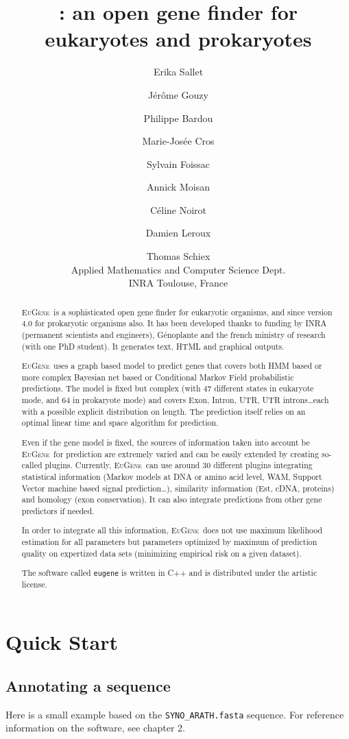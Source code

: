 \documentclass[a4paper,titlepage]{report}
\author{Erika Sallet \and J\'er\^ome Gouzy \and Philippe Bardou \and Marie-Jos\'ee Cros \and Sylvain Foissac \and  Annick Moisan \and C\'eline Noirot \and Damien Leroux \and Thomas Schiex \\ Applied Mathematics and Computer Science Dept.\\ INRA Toulouse, France}
\title{\EuGene: an open gene finder for eukaryotes and prokaryotes}
\newcommand{\EuGene}{\textsc{EuG\`ene}}
\begin{document}
\maketitle
\tableofcontents

\begin{abstract}
  \EuGene\ is a sophisticated open gene finder for eukaryotic
  organisms, and since version 4.0 for prokaryotic organisms also. 
  It has been developed thanks to funding by INRA
  (permanent scientists and engineers), G\'enoplante and the french
  ministry of research (with one PhD student). It generates text, HTML
  and graphical outputs.
  
  \EuGene\ uses a graph based model to predict genes that covers both
  HMM based or more complex Bayesian net based or Conditional Markov Field probabilistic
  predictions. The model is fixed but complex (with 47 different
  states in eukaryote mode, and 64 in prokaryote mode) 
  and covers Exon, Intron, UTR, UTR introns\ldots each with a
  possible explicit distribution on length. The prediction itself
  relies on an optimal linear time and space algorithm for prediction.
  
  Even if the gene model is fixed, the sources of information taken
  into account be \EuGene\ for prediction are extremely varied and can
  be easily extended by creating so-called plugins. Currently,
  \EuGene\ can use around 30 different plugins integrating statistical
  information (Markov models at DNA or amino acid level, WAM, Support
  Vector machine based signal prediction\ldots), similarity information
  (Est, cDNA, proteins) and homology (exon conservation). It can also
  integrate predictions from other gene predictors if needed.
  
  In order to integrate all this information, \EuGene\ does not use
  maximum likelihood estimation for all parameters but parameters
  optimized by maximum of prediction quality on expertized data sets (minimizing
  empirical risk on a given dataset).

  The software called \texttt{eugene} is written in C++ and is distributed 
  under the artistic license.
 \end{abstract}

\chapter{Quick Start}

\section{Annotating a sequence}
Here is a small example based on the \texttt{SYNO\_ARATH.fasta} sequence.
For reference information on the software, see chapter 2.
\end{document}
